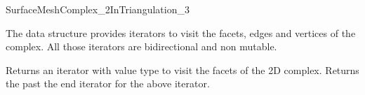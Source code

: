 \begin{ccRefConcept}{SurfaceMeshComplex_2InTriangulation_3}







The data structure provides iterators  to visit  
the facets, edges and vertices of the complex.
All those iterators are bidirectional and
non mutable.

{Returns an iterator with value type  to visit the facets
of the 2D complex.}
\ccGlue
{}
{Returns the  past the end iterator for the above iterator.}


\end{ccRefConcept}
